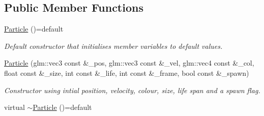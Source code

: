 \subsection*{Public Member Functions}
\begin{DoxyCompactItemize}
\item 
\hypertarget{classParticle_a611ed46b6f07319f0e2f7bd588192a30}{\hyperlink{classParticle_a611ed46b6f07319f0e2f7bd588192a30}{Particle} ()=default}\label{classParticle_a611ed46b6f07319f0e2f7bd588192a30}

\begin{DoxyCompactList}\small\item\em Default constructor that initialises member variables to default values. \end{DoxyCompactList}\item 
\hyperlink{classParticle_abf90ea6b45c5e07a3945b1ac4b2b641d}{Particle} (glm\-::vec3 const \&\-\_\-pos, glm\-::vec3 const \&\-\_\-vel, glm\-::vec4 const \&\-\_\-col, float const \&\-\_\-size, int const \&\-\_\-life, int const \&\-\_\-frame, bool const \&\-\_\-spawn)
\begin{DoxyCompactList}\small\item\em Constructor using intial position, velocity, colour, size, life span and a spawn flag. \end{DoxyCompactList}\item 
\hypertarget{classParticle_a9d921eb3cc8673d98639bfc99c34da92}{virtual \hyperlink{classParticle_a9d921eb3cc8673d98639bfc99c34da92}{$\sim$\-Particle} ()=default}\label{classParticle_a9d921eb3cc8673d98639bfc99c34da92}


\end{DoxyCompactItemize}

